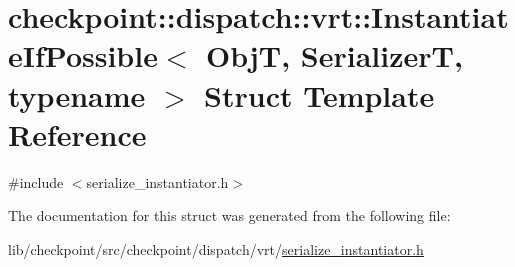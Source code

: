 \hypertarget{structcheckpoint_1_1dispatch_1_1vrt_1_1_instantiate_if_possible}{}\section{checkpoint\+:\+:dispatch\+:\+:vrt\+:\+:Instantiate\+If\+Possible$<$ ObjT, SerializerT, typename $>$ Struct Template Reference}
\label{structcheckpoint_1_1dispatch_1_1vrt_1_1_instantiate_if_possible}


{\ttfamily \#include $<$serialize\+\_\+instantiator.\+h$>$}



The documentation for this struct was generated from the following file\+:\begin{DoxyCompactItemize}
\item 
lib/checkpoint/src/checkpoint/dispatch/vrt/\hyperlink{serialize__instantiator_8h}{serialize\+\_\+instantiator.\+h}\end{DoxyCompactItemize}
